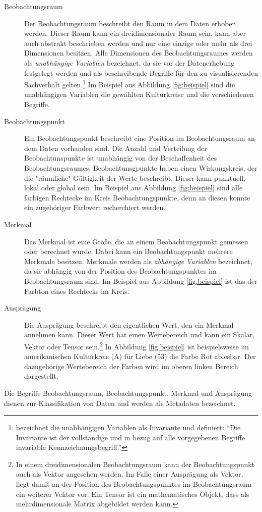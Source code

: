 \documentclass[a4paper, 12pt, DIVcalc, onepage, pdftex, headsepline, footsepline]{scrreprt}
\begin{document}
\begin{description}
\item[Beobachtungsraum]
Der Beobachtungsraum beschreibt den Raum in dem Daten erhoben werden. Dieser Raum kann ein
dreidimensionaler Raum sein, kann aber auch abstrakt beschrieben werden und nur eine einzige oder
mehr als drei Dimensionen besitzen. Alle Dimensionen des Beobachtungsraumes werden als \textit{unabhängige
Variablen} bezeichnet, da sie vor der Datenerhebung festgelegt werden und als beschreibende Begriffe für
den zu visualisierenden Sachverhalt gelten.\footnote{\citep[S.\,24]{Bertin} bezeichnet die unabhängigen
Variablen als Invariante und definiert: "`Die Invariante ist der vollständige und in bezug auf alle vorgegebenen
Begriffe invariable Kennzeichnungsbegriff."'} Im Beispiel aus Abbildung \ref{fig:beispiel} sind die
unabhängigen Variablen die gewählten Kulturkreise und die verschiedenen Begriffe.
\item[Beobachtungspunkt]
Ein Beobachtungspunkt beschreibt eine Position im Beobachtungsraum an dem Daten vorhanden sind. Die Anzahl und Verteilung
der Beobachtunspunkte ist unabhängig von der Beschaffenheit des Beobachtungsraumes. Beobachtunsgpunkte haben einen
Wirkungskreis, der die "räumliche" Gültigkeit der Werte beschreibt. Dieser kann punktuell, lokal oder global sein.
Im Beispiel aus Abbildung \ref{fig:beispiel} sind alle farbigen Rechtecke im Kreis Beobachtungspunkte, denn an
diesen konnte ein zugehöriger Farbwert recherchiert werden.
\item[Merkmal]
Das Merkmal ist eine Größe, die an einem Beobachtungspunkt gemessen oder berechnet wurde. Dabei kann
ein Beobachtungspunkt mehrere Merkmale besitzen. Merkmale werden als \textit{abhängige Variablen} bezeichnet, da
sie abhängig von der Position des Beobachtungspunktes im Beobachtungsraum sind.
Im Beispiel aus Abbildung \ref{fig:beispiel} ist das der Farbton eines Rechtecks im Kreis.
\item[Ausprägung]
Die Ausprägung beschreibt den eigentlichen Wert, den ein Merkmal annehmen kann. Dieser Wert hat einen
Wertebereich und kann ein Skalar, Vektor oder Tensor sein.\footnote{In einem dreidimensionalen Beobachtungsraum
kann der Beobachtungspunkt auch als Vektor angesehen werden. Im Falle einer Ausprägung als Vektor, liegt damit
an der Position des Beobachtungspunktes im Beobachtungsraum ein weiterer Vektor vor. Ein Tensor ist ein mathematisches
Objekt, dass als mehrdimensionale Matrix abgebildet werden kann.}
In Abbildung \ref{fig:beispiel} ist beispielsweise im amerikanischen Kulturkreis (A) für Liebe (53) die Farbe
Rot ablesbar. Der dazugehörige Wertebereich der Farben wird im oberen linken Bereich dargestellt.
\end{description}
Die Begriffe Beobachtungsraum, Beobachtungspunkt, Merkmal und Ausprägung dienen zur Klassifikation von Daten
und werden als Metadaten bezeichnet.
\end{document}
